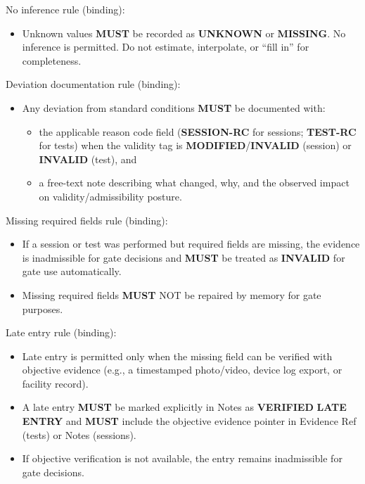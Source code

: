 \documentclass[10pt]{article}
\begin{document}
No inference rule (binding):

\begin{itemize}
\item Unknown values \textbf{MUST} be recorded as \textbf{UNKNOWN} or \textbf{MISSING}. No inference is permitted. Do not estimate, interpolate, or “fill in” for completeness.
\end{itemize}

Deviation documentation rule (binding):

\begin{itemize}
\item Any deviation from standard conditions \textbf{MUST} be documented with:
\begin{itemize}
\item the applicable reason code field (\textbf{SESSION-RC} for sessions; \textbf{TEST-RC} for tests) when the validity tag is \textbf{MODIFIED}/\textbf{INVALID} (session) or \textbf{INVALID} (test), and
\item a free-text note describing what changed, why, and the observed impact on validity/admissibility posture.
\end{itemize}
\end{itemize}

Missing required fields rule (binding):

\begin{itemize}
\item If a session or test was performed but required fields are missing, the evidence is inadmissible for gate decisions and \textbf{MUST} be treated as \textbf{INVALID} for gate use automatically.
\item Missing required fields \textbf{MUST} NOT be repaired by memory for gate purposes.
\end{itemize}

Late entry rule (binding):

\begin{itemize}
\item Late entry is permitted only when the missing field can be verified with objective evidence (e.g., a timestamped photo/video, device log export, or facility record).
\item A late entry \textbf{MUST} be marked explicitly in Notes as \textbf{VERIFIED} \textbf{LATE} \textbf{ENTRY} and \textbf{MUST} include the objective evidence pointer in Evidence Ref (tests) or Notes (sessions).
\item If objective verification is not available, the entry remains inadmissible for gate decisions.
\end{itemize}
\end{document}
